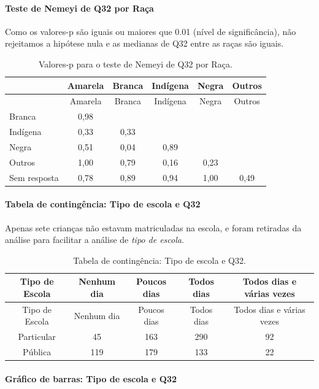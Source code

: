 \documentclass[]{article}
\let\oldparagraph\paragraph
\renewcommand{\paragraph}[1]{\oldparagraph{#1}\mbox{}}
\begin{document}
\hypertarget{teste-de-nemeyi-de-q32-por-rauxe7a}{%
\paragraph{Teste de Nemeyi de Q32 por Raça}\label{teste-de-nemeyi-de-q32-por-rauxe7a}}

Como os valores-p são iguais ou maiores que 0.01 (nível de significância), não rejeitamos a hipótese nula e as medianas de Q32 entre as raças são iguais.

\begin{longtable}[]{@{}lccccc@{}}
\caption{\label{tab:unnamed-chunk-1114}Valores-p para o teste de Nemeyi de Q32 por Raça.}\tabularnewline
\toprule
& Amarela & Branca & Indígena & Negra & Outros\tabularnewline
\midrule
\endfirsthead
\toprule
& Amarela & Branca & Indígena & Negra & Outros\tabularnewline
\midrule
\endhead
Branca & 0,98 & & & &\tabularnewline
Indígena & 0,33 & 0,33 & & &\tabularnewline
Negra & 0,51 & 0,04 & 0,89 & &\tabularnewline
Outros & 1,00 & 0,79 & 0,16 & 0,23 &\tabularnewline
Sem resposta & 0,78 & 0,89 & 0,94 & 1,00 & 0,49\tabularnewline
\bottomrule
\end{longtable}

\cleardoublepage

\hypertarget{tabela-de-continguxeancia-tipo-de-escola-e-q32}{%
\paragraph{Tabela de contingência: Tipo de escola e Q32}\label{tabela-de-continguxeancia-tipo-de-escola-e-q32}}

Apenas sete crianças não estavam matriculadas na escola, e foram retiradas da análise para facilitar a análise de \emph{tipo de escola}.

\begin{longtable}[]{@{}ccccc@{}}
\caption{\label{tab:unnamed-chunk-1115}Tabela de contingência: Tipo de escola e Q32.}\tabularnewline
\toprule
Tipo de Escola & Nenhum dia & Poucos dias & Todos dias & Todos dias e várias vezes\tabularnewline
\midrule
\endfirsthead
\toprule
Tipo de Escola & Nenhum dia & Poucos dias & Todos dias & Todos dias e várias vezes\tabularnewline
\midrule
\endhead
Particular & 45 & 163 & 290 & 92\tabularnewline
Pública & 119 & 179 & 133 & 22\tabularnewline
\bottomrule
\end{longtable}

\hypertarget{gruxe1fico-de-barras-tipo-de-escola-e-q32}{%
\paragraph{Gráfico de barras: Tipo de escola e Q32}\label{gruxe1fico-de-barras-tipo-de-escola-e-q32}}
\end{document}
